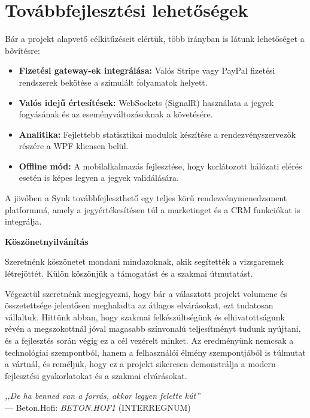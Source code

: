 \documentclass[colorlinks]{docs}
\theoremstyle{definition}
\theoremstyle{remark}
\begin{document}
\section{Továbbfejlesztési lehetőségek}
Bár a projekt alapvető célkitűzéseit elértük, több irányban is látunk lehetőséget a bővítésre:
\begin{itemize}
    \item \textbf{Fizetési gateway-ek integrálása:} Valós Stripe vagy PayPal fizetési rendszerek bekötése a szimulált folyamatok helyett.
    \item \textbf{Valós idejű értesítések:} WebSockets (SignalR) használata a jegyek fogyásának és az eseményváltozásoknak a követésére.
    \item \textbf{Analitika:} Fejlettebb statisztikai modulok készítése a rendezvényszervezők részére a WPF kliensen belül.
    \item \textbf{Offline mód:} A mobilalkalmazás fejlesztése, hogy korlátozott hálózati elérés esetén is képes legyen a jegyek validálására.
\end{itemize}

A jövőben a Synk továbbfejleszthető egy teljes körű rendezvénymenedzsment platformmá, amely a jegyértékesítésen túl a marketinget és a CRM funkciókat is integrálja.

\newpage
\Huge\begin{center}
    \textbf{Köszönetnyilvánítás}
\end{center}\normalsize
Szeretnénk köszönetet mondani mindazoknak, akik segítették a vizsgaremek létrejöttét. Külön köszönjük a támogatást és a szakmai útmutatást. 

Végezetül szeretnénk megjegyezni, hogy bár a választott projekt volumene és összetettsége jelentősen meghaladta az átlagos elvárásokat, ezt tudatosan vállaltuk. Hittünk abban, hogy szakmai felkészültségünk és elhivatottságunk révén a megszokottnál jóval magasabb színvonalú teljesítményt tudunk nyújtani, és a fejlesztés során végig ez a cél vezérelt minket. Az eredményünk nemcsak a technológiai szempontból, hanem a felhasználói élmény szempontjából is túlmutat a vártnál, és reméljük, hogy ez a projekt sikeresen demonstrálja a modern fejlesztési gyakorlatokat és a szakmai elvárásokat.

\begin{flushright}
    \textit{,,De ha benned van a forrás, akkor legyen felette kút''} \\
    --- Beton.Hofi: \textit{BETON.HOF1} (INTERREGNUM)
\end{flushright}
\par
\end{document}

